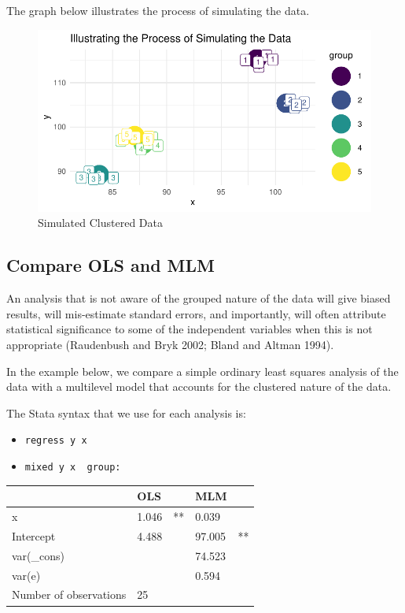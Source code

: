 \documentclass[
  letterpaper,
  DIV=11,
  numbers=noendperiod]{scrreprt}
\providecommand{\tightlist}{%
  \setlength{\itemsep}{0pt}\setlength{\parskip}{0pt}}\usepackage{longtable,booktabs,array}
\begin{document}
The graph below illustrates the process of simulating the data.

\begin{figure}

{\centering \includegraphics{./cross-sectional_files/figure-pdf/unnamed-chunk-3-1.pdf}

}

\caption{Simulated Clustered Data}

\end{figure}

\hypertarget{compare-ols-and-mlm}{%
\subsection{Compare OLS and MLM}\label{compare-ols-and-mlm}}

An analysis that is not aware of the grouped nature of the data will
give biased results, will mis-estimate standard errors, and importantly,
will often attribute statistical significance to some of the independent
variables when this is not appropriate (Raudenbush and Bryk 2002; Bland
and Altman 1994).

In the example below, we compare a simple ordinary least squares
analysis of the data with a multilevel model that accounts for the
clustered nature of the data.

The Stata syntax that we use for each analysis is:

\begin{itemize}
\tightlist
\item
  \texttt{regress\ y\ x}
\item
  \texttt{mixed\ y\ x\ \textbar{}\textbar{}\ group:}
\end{itemize}

\begin{longtable}[]{@{}lllll@{}}
\toprule()
& OLS & & MLM & \\
\midrule()
\endhead
x & 1.046 & ** & 0.039 & \\
Intercept & 4.488 & & 97.005 & ** \\
var(\_cons) & & & 74.523 & \\
var(e) & & & 0.594 & \\
Number of observations & 25 & & & \\
\bottomrule()
\end{longtable}
\end{document}
